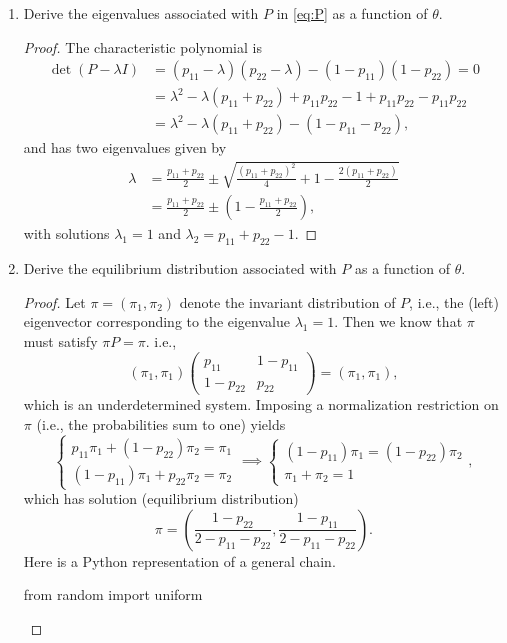 \documentclass[oneside,reqno]{amsart}
\theoremstyle{definition}
\begin{document}
\begin{enumerate}[label=(\roman*)]
\item
Derive the eigenvalues associated with $P$ in \eqref{eq:P} as a function of $\theta$. 
\begin{proof}
The characteristic polynomial is
\begin{align*}
	\det(P - \lambda I) &= (p_{11} - \lambda )(p_{22} - \lambda) - (1-p_{11})(1-p_{22}) = 0 \\
	& = \lambda^2 - \lambda (p_{11} + p_{22}) + p_{11}p_{22} - 1 + p_{11} p_{22} - p_{11}p_{22} \\
	& = \lambda^2 - \lambda (p_{11} + p_{22}) - (1 - p_{11} - p_{22}),
\end{align*}
and has two eigenvalues given by
\begin{align*}
	\lambda &= \frac{p_{11} + p _{22}}{2} \pm \sqrt{\frac{(p_{11} + p _{22})^2}{4} +1 - \frac{2(p_{11} + p _{22})}{2}} \\
	&= \frac{p_{11} + p _{22}}{2} \pm \left(1 - \frac{p_{11} + p _{22}}{2} \right),
\end{align*}
with solutions $\lambda_1 = 1$ and $\lambda_2=  p_{11}+p_{22}-1$.
\end{proof}
\item
Derive the equilibrium distribution associated with $P$ as a function of $\theta$.
\begin{proof}
Let $\pi = (\pi_1, \pi_2)$ denote the invariant distribution of $P$, i.e., the (left) eigenvector corresponding to the eigenvalue $\lambda_1 = 1$. Then we know that $\pi$ must satisfy $\pi P = \pi$. i.e.,
\[
		(\pi_1,  \pi_1)
	 \begin{pmatrix}
		p_{11} & 1-p_{11} \\
		1- p_{22} & p_{22}
	\end{pmatrix}
	=(\pi_1,  \pi_1),
\]
which is an underdetermined system. Imposing a normalization restriction on $\pi$ (i.e., the probabilities sum to one) yields
\[
	\begin{cases}
		p_{11} \pi_1 + (1- p_{22}) \pi_2 = \pi_1 \\
		(1-p_{11}) \pi_1 + p_{22} \pi_2 = \pi_2
	\end{cases}
	\implies  
	\begin{cases}
		(1-p_{11}) \pi_1 =  (1- p_{22}) \pi_2 \\
		\pi_1 + \pi_2 = 1
	\end{cases},
\]
which has solution (equilibrium distribution)
\[
	\pi = \left(\frac{1-p_{22}}{2-p_{11}  - p_{22}}, \frac{1-p_{11}}{2-p_{11} - p_{22}} \right).
\]
Here is a Python representation of a general chain.
\begin{python3code}
from random import uniform


\end{python3code}
\end{proof}
\end{enumerate}
\end{document}
